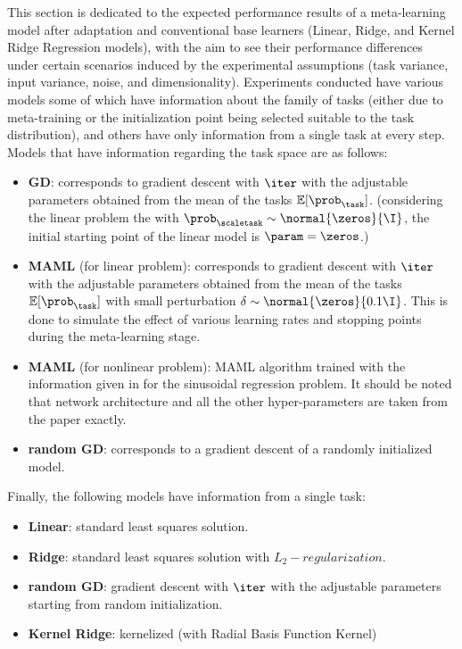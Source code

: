 
This section is dedicated to the expected performance results of a meta-learning model after adaptation and conventional base learners (\eg Linear, Ridge, and Kernel Ridge Regression models), with the aim to see their performance differences under certain scenarios induced by the experimental assumptions (\eg task variance, input variance, noise, and dimensionality). 
Experiments conducted have various models some of which have information about the family of tasks (either due to meta-training or the initialization point being selected suitable to the task distribution), and others have only information from a single task at every step.
Models that have information regarding the task space are as follows:
\begin{itemize}
  \item \textbf{GD}: corresponds to gradient descent with $\iter$ with the adjustable parameters obtained from the mean of the tasks $\mathbb{E}[\prob_{\task}]$. (\eg considering the linear problem the with $\prob_{\scaletask}\sim\normal{\zeros}{\I}$, the initial starting point of the linear model is $\param=\zeros$.)
  \item \textbf{MAML} (for linear problem): corresponds to gradient descent with $\iter$ with the adjustable parameters obtained from the mean of the tasks $\mathbb{E}[\prob_{\task}]$ with small perturbation $\delta\sim\normal{\zeros}{0.1\I}$. This is done to simulate the effect of various learning rates and stopping points during the meta-learning stage.
  \item \textbf{MAML} (for nonlinear problem): MAML algorithm trained with the information given in \cite{finn2017} for the sinusoidal regression problem. It should be noted that network architecture and all the other hyper-parameters are taken from the paper exactly.
  \item \textbf{random GD}: corresponds to a gradient descent of a randomly initialized model.
\end{itemize} 

Finally, the following models have information from a single task:
\begin{itemize}
  \item \textbf{Linear}: standard least squares solution.
  \item \textbf{Ridge}: standard least squares solution with $L_2-regularization$.
  \item \textbf{random GD}: gradient descent with $\iter$ with the adjustable parameters starting from random initialization.
  \item \textbf{Kernel Ridge}: kernelized (with Radial Basis Function Kernel) 
\end{itemize}

